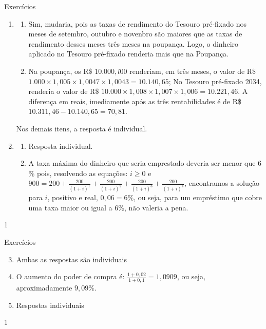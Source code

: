 \def\currentcolor{cor1}
\begin{answer}{Exercícios}
{\exerciselist
  \begin{enumerate}
    \item 
    \begin{enumerate}
      \item Sim, mudaria, pois as taxas de rendimento do Tesouro pré-fixado nos meses de setembro, outubro e novenbro são maiores que as taxas de rendimento desses meses três meses na poupança. Logo, o dinheiro aplicado no Tesouro pré-fixado renderia mais que na Poupança.
      \item Na poupança, os R\$ $10.000,l00$ renderiam, em três meses, o valor de R\$ $1.000\times1{,}005\times1{,}0047\times1{,}0043=10.140{,}65$; No Tesouro pré-fixado 2034, renderia o valor de R\$ $10.000\times 1{,}008\times 1{,}007\times 1{,}006=10.221{,}46$. A diferença em reais, imediamente após as três rentabilidades é de R\$ $10.311{,}46-10.140{,}65=70{,}81$.

    \end{enumerate}
    Nos demais itens, a resposta é individual.
    \item
    \begin{enumerate}
      \item Resposta individual.
      \item A taxa máxima do dinheiro que seria emprestado deveria ser menor que $6$\% pois, resolvendo as equações: $i\geq0$ e $900=\displaystyle200+\frac{200}{(1+i)^1}+\frac{200}{(1+i)^2}+\frac{200}{(1+i)^3}+\frac{200}{(1+i)^4}$, encontramos a solução para $i$,  positivo e real, $0{,}06=6$\%, ou seja, para um empréstimo que cobre uma taxa maior ou igual a $6$\%, não valeria a pena.
    \end{enumerate}
  \end{enumerate}
}{1}
\end{answer}
\clearmargin
\begin{answer}{Exercícios}
{\exerciselist
\begin{enumerate}
\setcounter{enumi}{2}
    \item Ambas as respostas são individuais

    \item O aumento do poder de compra é: $\displaystyle \frac{1+0{,}02}{1+0{,}1}=1{,}0909$, ou seja, aproximadamente $9{,}09$\%.
    \item Respostas individuais
  \end{enumerate}
}{1}
\end{answer}
\clearmargin
